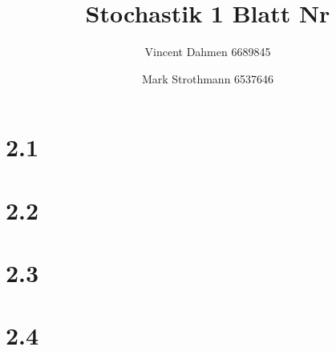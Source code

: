 \documentclass[12pt,a4paper]{article}
\title{Stochastik 1 Blatt Nr \Nr}
\author{Vincent Dahmen 6689845}
\author{Mark Strothmann 6537646}
\gdef\Nr{2}
\begin{document}
\maketitle{}


\section*{\Nr.1}


\section*{\Nr.2}


\section*{\Nr.3}


\section*{\Nr.4}

\end{document}
